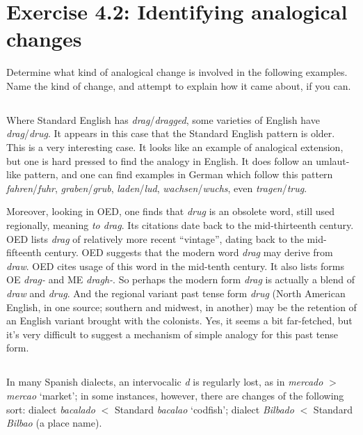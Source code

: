 \documentclass[12pt]{article}
\begin{document}
\section{Exercise 4.2: Identifying analogical changes}

Determine what kind of analogical change is involved in the following examples. Name the kind of change, and attempt to explain how it came about, if you can.

\setcounter{subsection}{1}
\subsection{}
Where Standard English has {\it drag}/{\it dragged}, some varieties of English have {\it drag}/{\it drug}. It appears in this case that the Standard English pattern is older. \\

This is a very interesting case. It looks like an example of analogical extension, but one is hard pressed to find the analogy in English. It does follow an umlaut-like pattern, and one can find examples in German which follow this pattern {\it fahren}/{\it fuhr}, {\it graben}/{\it grub}, {\it laden}/{\it lud}, {\it wachsen}/{\it wuchs}, even {\it tragen}/{\it trug}. 

Moreover, looking in OED, one finds that {\it drug} is an obsolete word, still used regionally, meaning {\it to drag}. Its citations date back to the mid-thirteenth century. OED lists {\it drag} of relatively more recent ``vintage'', dating back to the mid-fifteenth century. OED suggests that the modern word {\it drag} may derive from {\it draw}. OED cites usage of this word in the mid-tenth century. It also lists forms OE {\it drag-} and ME {\it dragh-}. So perhaps the modern form {\it drag} is actually a blend of {\it draw} and {\it drug}. And the regional variant past tense form {\it drug} (North American English, in one source; southern and midwest, in another) may be the retention of an English variant brought with the colonists. Yes, it seems a bit far-fetched, but it's very difficult to suggest a mechanism of simple analogy for this past tense form.

\setcounter{subsection}{3}
\subsection{}
In many Spanish dialects, an intervocalic {\it d} is regularly lost, as in {\it mercado} $>$ {\it mercao} `market'; in some instances, however, there are changes of the following sort: dialect {\it bacalado} $<$ Standard {\it bacalao} `codfish'; dialect {\it Bilbado} $<$ Standard {\it Bilbao} (a place name). \\
\end{document}
